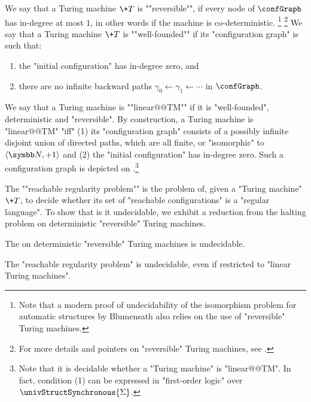 \AP We say that a Turing machine $\+T$ is ""reversible"", if every node of $\confGraph$ has in-degree at most 1, in other words if the machine is co-deterministic.%
\footnote{
    Note that a modern proof of undecidability of the isomorphism problem for automatic structures 
    by Blumensath \cite[\S VIII. Theorem 4.3, p. 396 \& second claim, p. 398]{Blumensath2024MSOModelTheory} 
    also relies on the use of "reversible" Turing machines.
}%
\footnote{
    For more details and pointers on "reversible" Turing machines,
    see \cite[Chapter 5]{Morita2017Reversible}.
}
We say that a Turing machine $\+T$ is ""well-founded"" if its "configuration graph" is such that:
\begin{enumerate}
    \item the "initial configuration" has in-degree zero, and
    \item there are no infinite backward paths $\gamma_0 \leftarrow \gamma_1 \leftarrow \cdots$ in $\confGraph$. 
\end{enumerate}

We say that a Turing machine is ""linear@@TM"" if it is "well-founded", deterministic and "reversible".
By construction, a Turing machine is "linear@@TM" "iff" (1) its "configuration graph" consists of a possibly infinite disjoint union of directed paths, which are all finite, or "isomorphic" to $\tup{\N, +1}$ and (2) the "initial configuration" has in-degree zero.
Such a configuration graph is depicted on
.\footnote{Note
that it is decidable whether a "Turing machine" is "linear@@TM". In fact, condition (1) can be expressed in "first-order logic" over $\univStructSynchronous{\Sigma}$.}

\AP The ""reachable regularity problem"" is the problem of, given a "Turing machine" $\+T$, to decide whether its set of "reachable configurations" is a "regular language". To show that is it undecidable, we exhibit a reduction from the halting problem on deterministic "reversible" Turing machines.

\begin{proposition}
    \AP\label{prop:halting-problem-detrevTM}
    The  on deterministic "reversible" Turing machines is undecidable.
\end{proposition}

\begin{lemma}
    \AP\label{lem:reachable-regularity}
    The "reachable regularity problem" is undecidable, even if restricted
    to "linear Turing machines".
\end{lemma}

